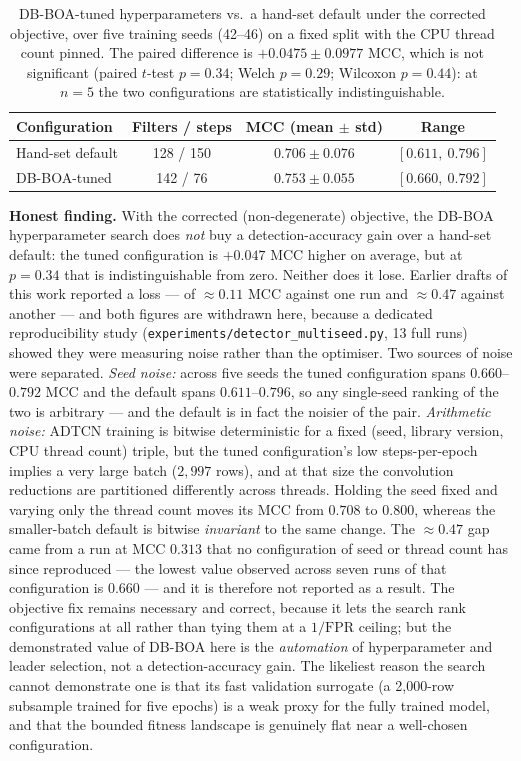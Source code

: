 \begin{table}[H]
\centering
\caption{DB-BOA-tuned hyperparameters vs.\ a hand-set default under the corrected objective, over five training seeds (42--46) on a fixed split with the CPU thread count pinned. The paired difference is $+0.0475 \pm 0.0977$ MCC, which is not significant (paired $t$-test $p=0.34$; Welch $p=0.29$; Wilcoxon $p=0.44$): at $n=5$ the two configurations are statistically indistinguishable.}
\label{tab:dbboa_vs_default}
\begin{tabular}{|l|c|c|c|}
\hline
\textbf{Configuration} & \textbf{Filters / steps} & \textbf{MCC (mean $\pm$ std)} & \textbf{Range} \\ \hline
Hand-set default & 128 / 150 & $0.706 \pm 0.076$ & $[0.611,\ 0.796]$ \\ \hline
DB-BOA-tuned     & 142 / 76  & $\mathbf{0.753 \pm 0.055}$ & $[0.660,\ 0.792]$ \\ \hline
\end{tabular}
\end{table}

\textbf{Honest finding.} With the corrected (non-degenerate) objective, the DB-BOA hyperparameter search does \emph{not} buy a detection-accuracy gain over a hand-set default: the tuned configuration is $+0.047$ MCC higher on average, but at $p=0.34$ that is indistinguishable from zero. Neither does it lose. Earlier drafts of this work reported a loss --- of $\approx 0.11$ MCC against one run and $\approx 0.47$ against another --- and both figures are withdrawn here, because a dedicated reproducibility study (\texttt{experiments/detector\_multiseed.py}, 13 full runs) showed they were measuring noise rather than the optimiser. Two sources of noise were separated. \emph{Seed noise:} across five seeds the tuned configuration spans $0.660$--$0.792$ MCC and the default spans $0.611$--$0.796$, so any single-seed ranking of the two is arbitrary --- and the default is in fact the noisier of the pair. \emph{Arithmetic noise:} ADTCN training is bitwise deterministic for a fixed (seed, library version, CPU thread count) triple, but the tuned configuration's low steps-per-epoch implies a very large batch ($2{,}997$ rows), and at that size the convolution reductions are partitioned differently across threads. Holding the seed fixed and varying only the thread count moves its MCC from $0.708$ to $0.800$, whereas the smaller-batch default is bitwise \emph{invariant} to the same change. The $\approx 0.47$ gap came from a run at MCC $0.313$ that no configuration of seed or thread count has since reproduced --- the lowest value observed across seven runs of that configuration is $0.660$ --- and it is therefore not reported as a result. The objective fix remains necessary and correct, because it lets the search rank configurations at all rather than tying them at a $1/\mathrm{FPR}$ ceiling; but the demonstrated value of DB-BOA here is the \emph{automation} of hyperparameter and leader selection, not a detection-accuracy gain. The likeliest reason the search cannot demonstrate one is that its fast validation surrogate (a 2{,}000-row subsample trained for five epochs) is a weak proxy for the fully trained model, and that the bounded fitness landscape is genuinely flat near a well-chosen configuration.

